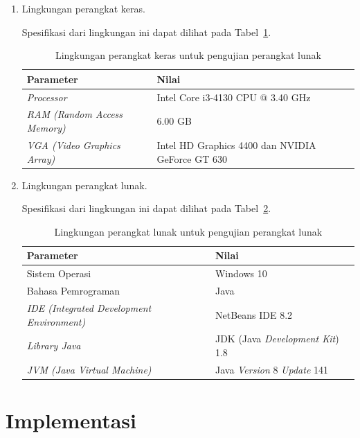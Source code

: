 \begin{enumerate}
\item Lingkungan perangkat keras.

Spesifikasi dari lingkungan ini dapat dilihat pada Tabel~\ref{tab:lingkunganpk}.

\begin{table}
\centering
\captionsetup{justification=centering}
\caption[Lingkungan perangkat keras untuk pengujian perangkat lunak]{Lingkungan perangkat keras untuk pengujian perangkat lunak}
\begin{tabular}{| l | l |}
\hline
Parameter & Nilai \\
\hline \hline
\textit{Processor} & Intel Core i3-4130 CPU @ 3.40 GHz \\
\hline
\textit{RAM (Random Access Memory)} & 6.00 GB \\
\hline
\textit{VGA (Video Graphics Array)} & Intel HD Graphics 4400 dan NVIDIA GeForce GT 630 \\
\hline
\end{tabular}
\label{tab:lingkunganpk}
\end{table}

\item Lingkungan perangkat lunak.

Spesifikasi dari lingkungan ini dapat dilihat pada Tabel~\ref{tab:lingkunganpl}.

\begin{table}
\centering
\captionsetup{justification=centering}
\caption[Lingkungan perangkat lunak untuk pengujian perangkat lunak]{Lingkungan perangkat lunak untuk pengujian perangkat lunak}
\begin{tabular}{| l | l |}
\hline
Parameter & Nilai \\
\hline \hline
Sistem Operasi & Windows 10 \\
\hline
Bahasa Pemrograman & Java \\
\hline
\textit{IDE (Integrated Development Environment)} & NetBeans IDE 8.2 \\
\hline
\textit{Library Java} & JDK (Java \textit{Development Kit}) 1.8 \\
\hline
\textit{JVM (Java Virtual Machine)} & Java \textit{Version} 8 \textit{Update} 141 \\
\hline
\end{tabular}
\label{tab:lingkunganpl}
\end{table}

\end{enumerate}

\section{Implementasi}
\label{sec:implementasi}

